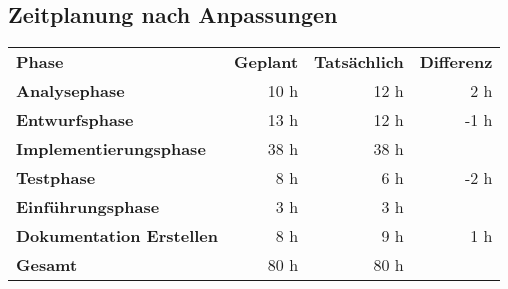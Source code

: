 \subsection{Zeitplanung nach Anpassungen}
\begin{tabularx}{\textwidth}{Xrrr}
\label{app:Zeitnachher} \\
\rowcolor{heading}\textbf{Phase} & \textbf{Geplant} & \textbf{Tatsächlich} & \textbf{Differenz} \\
\textbf{Analysephase} & 10 h   & 12 h  & 2 h \\
\rowcolor{odd}\textbf{Entwurfsphase} & 13 h  & 12 h  & -1 h \\
\textbf{Implementierungsphase} & 38 h  & 38 h  &   \\
\rowcolor{odd}\textbf{Testphase} & 8 h   & 6 h   & -2 h  \\
\textbf{Einführungsphase} & 3 h   & 3 h   &  \\
\rowcolor{odd}\textbf{Dokumentation Erstellen} & 8 h   & 9 h  & 1 h \\
\hline
\hline
\textbf{Gesamt} & 80 h  & 80 h  &  \\
\end{tabularx}
